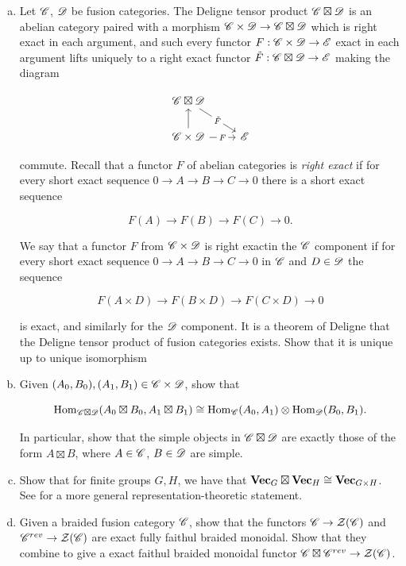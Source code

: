 \documentclass{article}
\theoremstyle{definition}
\numberwithin{figure}{section}
\begin{document}
\begin{enumerate}[\thesection .1.]
\begin{enumerate}[(a)]
\item Let $\mathscr{C}$, $\mathscr{D}$ be fusion categories. The Deligne tensor product $\mathscr{C}\boxtimes\mathscr{D}$ is an abelian category paired with a morphism $\mathscr{C}\times \mathscr{D}\to \mathscr{C}\boxtimes \mathscr{D}$ which is right exact in each argument, and such every functor $F:\mathscr{C}\times \mathscr{D} \to \mathscr{E}$ exact in each argument lifts uniquely to a right exact functor $\tilde{F}:\mathscr{C}\boxtimes \mathscr{D}\to \mathscr{E}$ making the diagram

\[\begin{tikzcd}
	{\Ccat\boxtimes \Dcat} \\
	{\Ccat\times \Dcat} & \Ecat
	\arrow["F"{description}, from=2-1, to=2-2]
	\arrow["{\tilde{F}}"{description}, from=1-1, to=2-2]
	\arrow[from=2-1, to=1-1]
\end{tikzcd}\]

commute. Recall that a functor $F$ of abelian categories is \textit{right exact} if for every short exact sequence $0\to A\to B\to C\to 0$ there is a short exact sequence

$$F(A)\to F(B)\to F(C)\to 0.$$

We say that a functor $F$ from $\mathscr{C}\times \mathscr{D}$ is right exactin the $\mathscr{C}$ component if for every short exact sequence $0\to A\to B\to C\to 0$ in $\mathscr{C}$ and $D\in \mathscr{D}$ the sequence

$$F(A\times D)\to F(B\times D)\to F(C\times D)\to 0$$

is exact, and similarly for the $\mathscr{D}$ component. It is a theorem of Deligne that the Deligne tensor product of fusion categories exists. Show that it is unique up to unique isomorphism

\item Given $(A_0,B_0),(A_1,B_1)\in \mathscr{C}\times \mathscr{D}$, show that

$$\mathrm{Hom}_{\mathscr{C}\boxtimes \mathscr{D}}(A_0\boxtimes B_0,A_1\boxtimes B_1)\cong \mathrm{Hom}_{\mathscr{C}}(A_0,A_1)\otimes \mathrm{Hom}_{\mathscr{D}}(B_0,B_1).$$

In particular, show that the simple objects in $\mathscr{C}\boxtimes \mathscr{D}$ are exactly those of the form $A\boxtimes B$, where $A\in\mathscr{C}$, $B\in \mathscr{D}$ are simple.

\item Show that for finite groups $G,H$, we have that $\bold{Vec}_G\boxtimes \bold{Vec}_H\cong \bold{Vec}_{G\times H}$. See  \cite[Prop. 1.11.2]{etingof2016tensor} for a more general representation-theoretic statement.

\item Given a braided fusion category $\mathscr{C}$, show that the functors $\mathscr{C}\to \mathcal{Z}(\mathscr{C})$ and $\mathscr{C}^{rev}\to \mathcal{Z}(\mathscr{C})$ are exact fully faithul braided monoidal. Show that they combine to give a exact faithul braided monoidal functor $\mathscr{C}\boxtimes \mathscr{C}^{rev}\to \mathcal{Z}(\mathscr{C})$.
\end{enumerate}


\end{enumerate}
\end{document}
